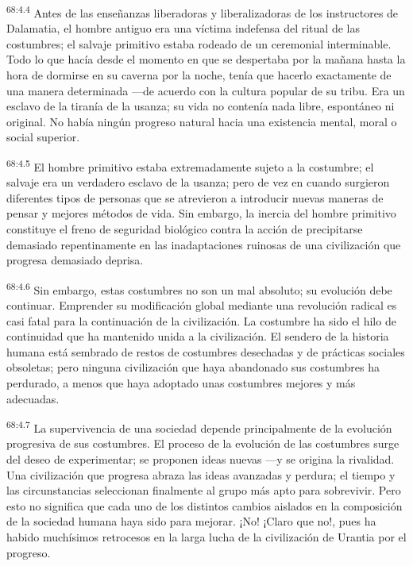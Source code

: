 \documentclass[twoside, 11pt]{book}
\begin{document}
\par
\textsuperscript{68:4.4} Antes de las enseñanzas liberadoras y liberalizadoras de los instructores de Dalamatia, el hombre antiguo era una víctima indefensa del ritual de las costumbres; el salvaje primitivo estaba rodeado de un ceremonial interminable. Todo lo que hacía desde el momento en que se despertaba por la mañana hasta la hora de dormirse en su caverna por la noche, tenía que hacerlo exactamente de una manera determinada ---de acuerdo con la cultura popular de su tribu. Era un esclavo de la tiranía de la usanza; su vida no contenía nada libre, espontáneo ni original. No había ningún progreso natural hacia una existencia mental, moral o social superior.

\par
\textsuperscript{68:4.5} El hombre primitivo estaba extremadamente sujeto a la costumbre; el salvaje era un verdadero esclavo de la usanza; pero de vez en cuando surgieron diferentes tipos de personas que se atrevieron a introducir nuevas maneras de pensar y mejores métodos de vida. Sin embargo, la inercia del hombre primitivo constituye el freno de seguridad biológico contra la acción de precipitarse demasiado repentinamente en las inadaptaciones ruinosas de una civilización que progresa demasiado deprisa.

\par
\textsuperscript{68:4.6} Sin embargo, estas costumbres no son un mal absoluto; su evolución debe continuar. Emprender su modificación global mediante una revolución radical es casi fatal para la continuación de la civilización. La costumbre ha sido el hilo de continuidad que ha mantenido unida a la civilización. El sendero de la historia humana está sembrado de restos de costumbres desechadas y de prácticas sociales obsoletas; pero ninguna civilización que haya abandonado sus costumbres ha perdurado, a menos que haya adoptado unas costumbres mejores y más adecuadas.

\par
\textsuperscript{68:4.7} La supervivencia de una sociedad depende principalmente de la evolución progresiva de sus costumbres. El proceso de la evolución de las costumbres surge del deseo de experimentar; se proponen ideas nuevas ---y se origina la rivalidad. Una civilización que progresa abraza las ideas avanzadas y perdura; el tiempo y las circunstancias seleccionan finalmente al grupo más apto para sobrevivir. Pero esto no significa que cada uno de los distintos cambios aislados en la composición de la sociedad humana haya sido para mejorar. ¡No! ¡Claro que no!, pues ha habido muchísimos retrocesos en la larga lucha de la civilización de Urantia por el progreso.
\end{document}

